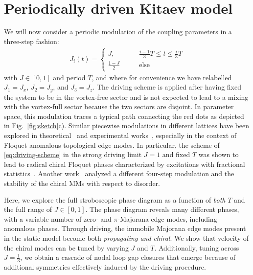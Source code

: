 \documentclass[aps,prb,twocolumn,superscriptaddress,groupedaddress]{revtex4}
\begin{document}
\section{Periodically driven Kitaev model}
\label{sec:driven-topo}

We will now consider a periodic modulation of the coupling parameters in a three-step fashion:
%
\begin{align}
J_i(t) = \begin{cases} 
J, \qquad & \frac{i-1}{3}T \le t \le \frac{i}{3} T \\
\frac{1-J}{2} \qquad & \text{else}
\end{cases}
\label{eq:driving-scheme}
\end{align}
%
with $J \in [0,1]$ and period $T$, and where for convenience we have relabelled $J_1 = J_x$, $J_2 = J_y$, and $J_3 = J_z$.
The driving scheme is applied after having fixed the system to be in the vortex-free sector and is not expected to lead to a mixing with the vortex-full sector because the two sectors are disjoint.
In parameter space, this modulation traces a typical path connecting the red dots as depicted in  Fig.~\ref{fig:sketch}c).
Similar piecewise modulations in different lattices have been explored in theoretical~\cite{Rudner:2013,Molignini:2019} and experimental works~\cite{Mukherjee:2017,Mukherjee:2018, Wintersperger:2020}, especially in the context of Floquet anomalous topological edge modes.
In particular, the scheme of \eqref{eq:driving-scheme} in the strong driving limit $J=1$ and fixed $T$ was shown to lead to radical chiral Floquet phases characterized by excitations with fractional statistics~\cite{Po:2017}.
Another work~\cite{Fulga:2019} analyzed a different four-step modulation and the stability of the chiral MMs with respect to disorder.

Here, we explore the full stroboscopic phase diagram as a function of \emph{both} $T$ and the full range of $J \in [0,1]$.
The phase diagram reveals many different phases, with a variable number of zero- and $\pi$-Majorana edge modes, including anomalous phases.
Through driving, the immobile Majorana edge modes present in the static model become both {\it propagating and chiral}. 
We  show that  velocity of the chiral modes can be  tuned by   varying $J$ and $T$.
Additionally,  tuning across $J=\frac{1}{3}$, we obtain a cascade of nodal loop gap closures that emerge because of additional symmetries effectively induced by the driving procedure.
\end{document}

